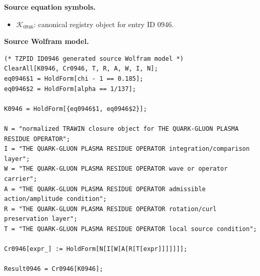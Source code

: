 \begin{minipage}[t]{0.49\linewidth}
\begingroup
\small
\raggedright
\textbf{Source equation symbols.}\par
\begin{itemize}[leftmargin=1.35em,itemsep=1pt,topsep=1pt,parsep=0pt]
    \item $\mathcal{K}_{0946}$: canonical registry object for entry ID 0946.
\end{itemize}
\endgroup
\end{minipage}\hfill
\begin{minipage}[t]{0.47\linewidth}
\begingroup
\scriptsize
\raggedright
\textbf{Source Wolfram model.}\par
\begin{Verbatim}[fontsize=\tiny,breaklines=true,breakanywhere=true]
(* TZPID ID0946 generated source Wolfram model *)
ClearAll[K0946, Cr0946, T, R, A, W, I, N];
eq0946$1 = HoldForm[chi - 1 == 0.185];
eq0946$2 = HoldForm[alpha == 1/137];

K0946 = HoldForm[{eq0946$1, eq0946$2}];

N = "normalized TRAWIN closure object for THE QUARK-GLUON PLASMA RESIDUE OPERATOR";
I = "THE QUARK-GLUON PLASMA RESIDUE OPERATOR integration/comparison layer";
W = "THE QUARK-GLUON PLASMA RESIDUE OPERATOR wave or operator carrier";
A = "THE QUARK-GLUON PLASMA RESIDUE OPERATOR admissible action/amplitude condition";
R = "THE QUARK-GLUON PLASMA RESIDUE OPERATOR rotation/curl preservation layer";
T = "THE QUARK-GLUON PLASMA RESIDUE OPERATOR local source condition";

Cr0946[expr_] := HoldForm[N[I[W[A[R[T[expr]]]]]]];

Result0946 = Cr0946[K0946];
\end{Verbatim}
\endgroup
\end{minipage}

